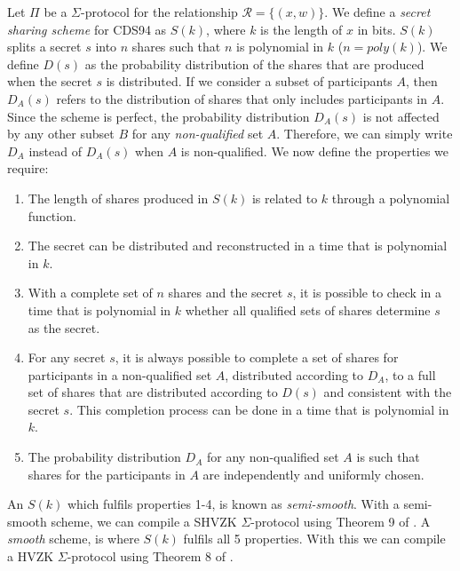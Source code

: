 \begin{definition}\label{def:secret-sharing}
Let $\Pi$ be a $\Sigma$-protocol for the relationship $\mathcal R = \{(x,w)\}$. We define a \textit{secret sharing scheme} for CDS94 as $S(k)$, where $k$ is the length of $x$ in bits. $S(k)$ splits a secret $s$ into $n$ shares such that $n$ is polynomial in $k$ ($n = poly(k)$). We define $D(s)$ as the probability distribution of the shares that are produced when the secret $s$ is distributed. If we consider a subset of participants $A$, then $D_A(s)$ refers to the distribution of shares that only includes participants in $A$. Since the scheme is perfect, the probability distribution $D_A(s)$ is not affected by any other subset $B$ for any \textit{non-qualified} set $A$. Therefore, we can simply write $D_A$ instead of $D_A(s)$ when $A$ is non-qualified. We now define the properties we require:
    \begin{enumerate}
        \item The length of shares produced in $S(k)$ is related to $k$ through a polynomial function.
        \item The secret can be distributed and reconstructed in a time that is polynomial in $k$.
        \item With a complete set of $n$ shares and the secret $s$, it is possible to check in a time that is polynomial in $k$ whether all qualified sets of shares determine $s$ as the secret.
        \item For any secret $s$, it is always possible to complete a set of shares for participants in a non-qualified set $A$, distributed according to $D_A$, to a full set of shares that are distributed according to $D(s)$ and consistent with the secret $s$. This completion process can be done in a time that is polynomial in $k$.
        \item The probability distribution $D_A$ for any non-qualified set $A$ is such that shares for the participants in $A$ are independently and uniformly chosen.
    \end{enumerate}
\end{definition}

An $S(k)$ which fulfils properties 1-4, is known as \textit{semi-smooth}. With a semi-smooth scheme, 
we can compile a SHVZK $\Sigma$-protocol using Theorem 9 of \cite{CDS94}. A \textit{smooth} scheme, is where $S(k)$ 
fulfils all 5 properties. With this we can compile a HVZK $\Sigma$-protocol using Theorem 8 of \cite{CDS94}.

